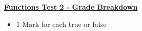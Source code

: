\documentclass[12pt]{article} %
\begin{document}
	\renewcommand*{\coursecode}{MATH 235} %
	\renewcommand*{\assgnnumber}{Assignment 1} %
	\renewcommand*{\submdate}{September 14, 2021} %
	\renewcommand*{\studentfname}{Abdullah} %
	\renewcommand*{\studentlname}{Zubair} %
    \renewcommand*{\proofname}{Proof:}

	\renewcommand\qedsymbol{$\blacksquare$}
	\setfigpath
	\fancyhfoffset[L,O]{0pt} %




\begin{center}
	\textbf{\underline{\Huge{Functions Test 2 - Grade Breakdown}}}
\end{center}

\begin{qstn} 
  \begin{itemize}
    \item $1$ Mark for each true or false
  \end{itemize}
\end{qstn}
\end{document}
